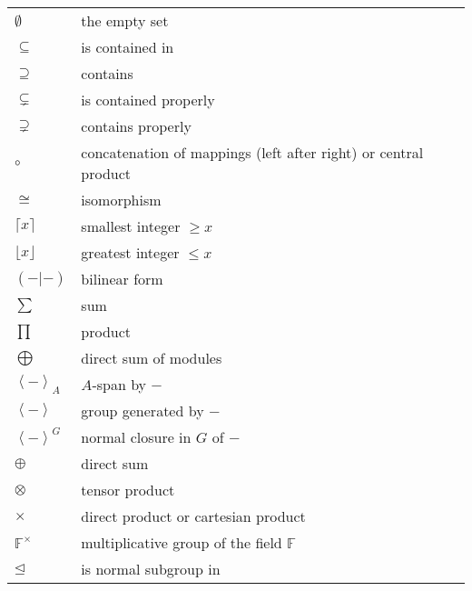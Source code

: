 \documentclass[openany,11pt,british]{book}
\newcommand{\F}{\ensuremath{\mathbb{F}}}
\theoremstyle{changebreak}
\begin{document}
\label{NotationIndex}
\begin{longtable}{|lll|}
\hline\endfoot
\hline\endhead
\hline
\multicolumn{3}{|l|}{Symbols:}\\
\hline
$\emptyset$             & the empty set
                        & \\
$\subseteq$             & is contained in
                        & \\
$\supseteq$             & contains
                        & \\
$\subsetneq$            & is contained properly
                        & \\
$\supsetneq$            & contains properly
                        & \\
$\circ$                 & concatenation of mappings (left after right)
                          or central product
                        & %
                        \\
$\cong$                 & isomorphism
                        & \\
$\lceil x \rceil$       & smallest integer $\ge x$
                        & \\
$\lfloor x \rfloor$     & greatest integer $\le x$
                        & \\
$(-|-)$                 & bilinear form
                        & \\
$\displaystyle\sum$     & sum
                        & \\
$\displaystyle\prod$    & product
                        & \\
$\displaystyle\bigoplus$ & direct sum of modules
                        & \\
$\left< - \right>_A$    & $A$-span by $-$
                        & \\
$\left< - \right>$      & group generated by $-$
                        & \\
$\left< - \right>^G$    & normal closure in $G$ of $-$
                        & \\
$\oplus$                & direct sum
                        & \\
$\otimes$               & tensor product
                        & \\
$\times$                & direct product or cartesian product
                        & \\
$\F^\times$             & multiplicative group of the field $\F$
                        & \\
$\unlhd$                & is normal subgroup in 

\end{longtable}
\end{document}
